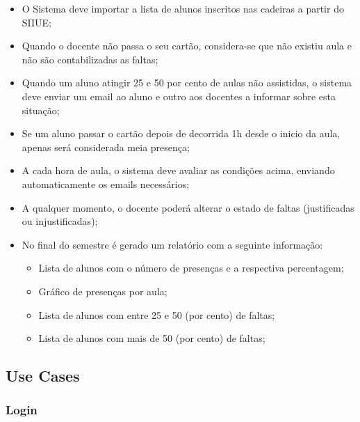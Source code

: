 \documentclass[11pt]{article}   %
\begin{document}
\begin{itemize}
    \item O Sistema deve importar a lista de alunos inscritos nas cadeiras a partir do SIIUE;
    \item Quando o docente não passa o seu cartão, considera-se que não existiu aula e não são contabilizadas as faltas;
    \item Quando um aluno atingir 25 e 50 por cento de aulas não assistidas, o sistema deve enviar um email ao aluno e outro aos docentes a informar sobre esta situação;
    \item Se um aluno passar o cartão depois de decorrida 1h desde o inicio da aula, apenas será considerada meia presença;
    \item A cada hora de aula, o sistema deve avaliar as condições acima, enviando automaticamente os emails necessários;
    \item A qualquer momento, o docente poderá alterar o estado de faltas (justificadas ou injustificadas);
    \item No final do semestre é gerado um relatório com a seguinte informação:
    \begin{itemize}
        \item Lista de alunos com o número de presenças e a respectiva percentagem;
        \item Gráfico de presenças por aula;
        \item Lista de alunos com entre 25 e 50 (por cento) de faltas;
        \item Lista de alunos com mais de 50 (por cento) de faltas;
    \end{itemize}
\end{itemize}

\subsection{Use Cases}

\subsubsection{Login} 
\end{document}
